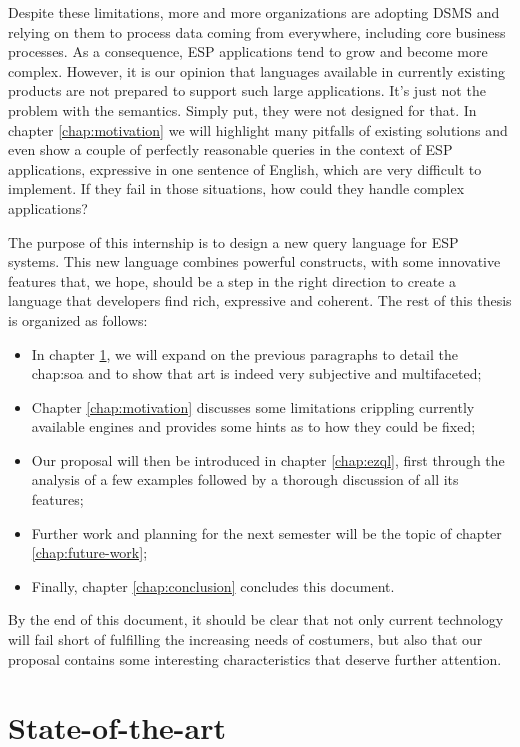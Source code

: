 \documentclass{report}
\begin{document}
Despite these limitations, more and more organizations are adopting
DSMS and relying on them to process data coming from everywhere,
including core business processes. As a consequence, ESP applications
tend to grow and become more complex. However, it is our opinion that
languages available in currently existing products are not prepared to
support such large applications. It's just not the problem with the
semantics. Simply put, they were not designed for that. In chapter
\ref{chap:motivation} we will highlight many pitfalls of existing
solutions and even show a couple of perfectly reasonable queries in
the context of ESP applications, expressive in one sentence of
English, which are very difficult to implement. If they fail in those
situations, how could they handle complex applications?

The purpose of this internship is to design a new query language for
ESP systems. This new language combines powerful constructs, with some
innovative features that, we hope, should be a step in the right
direction to create a language that developers find rich, expressive
and coherent. The rest of this thesis is organized as follows:

\begin{itemize}
\item In chapter \ref{chap:soa}, we will expand on the previous
  paragraphs to detail the chap:soa and to show that art is indeed
  very subjective and multifaceted;
\item Chapter \ref{chap:motivation} discusses some limitations
  crippling currently available engines and provides some hints as to
  how they could be fixed;
\item Our proposal will then be introduced in chapter \ref{chap:ezql},
  first through the analysis of a few examples followed by a thorough
  discussion of all its features;
\item Further work and planning for the next semester will be the
  topic of chapter \ref{chap:future-work};
\item Finally, chapter \ref{chap:conclusion} concludes this document.
\end{itemize}

By the end of this document, it should be clear that not only current
technology will fail short of fulfilling the increasing needs of
costumers, but also that our proposal contains some interesting
characteristics that deserve further attention.

\chapter{State-of-the-art}
\label{chap:soa}
\end{document}
